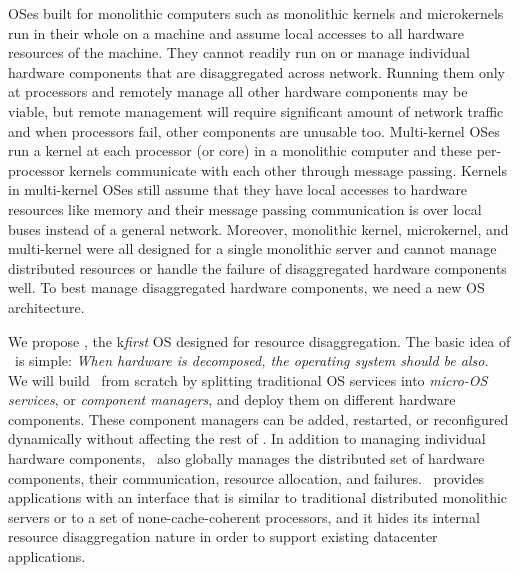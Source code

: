 \documentclass[10pt,times,twocolumn]{z2-article}
\begin{document}
OSes built for monolithic computers such as monolithic kernels and microkernels run in their whole on a machine
and assume local accesses to all hardware resources of the machine.
They cannot readily run on or manage individual hardware components that are disaggregated across network.
Running them only at processors and remotely manage all other hardware components may be viable, 
but remote management will require significant amount of network traffic
and when processors fail, other components are unusable too.
Multi-kernel OSes~\cite{Baumann-SOSP09,Barrelfish-DC,Helios-SOSP,fos-SOCC,Hive-SOSP} run a kernel
at each processor (or core) in a monolithic computer and these per-processor kernels communicate with each other through message passing.
Kernels in multi-kernel OSes still assume that they have local accesses to hardware resources like memory
and their message passing communication is over local buses instead of a general network.
Moreover, monolithic kernel, microkernel, and multi-kernel were all designed for a single monolithic server and 
cannot manage distributed resources or handle the failure of disaggregated hardware components well.
To best manage disaggregated hardware components, we need a new OS architecture.

We propose \lego, the {k\em first} OS designed for resource disaggregation. 
The basic idea of \dcos\ is simple:
{\em When hardware is decomposed, the operating system should be also.}
We will build \lego\ from scratch by splitting traditional OS services into {\em micro-OS services}, or {\em component managers}, 
and deploy them on different hardware components.
These component managers can be added, restarted, or reconfigured dynamically without affecting the rest of \dcos.
In addition to managing individual hardware components, 
\lego\ also globally manages the distributed set of hardware components, 
their communication, resource allocation, and failures.
\lego\ provides applications with an interface that is similar to traditional distributed monolithic servers
or to a set of none-cache-coherent processors, 
and it hides its internal resource disaggregation nature
in order to support existing datacenter applications.
\fi
\end{document}

